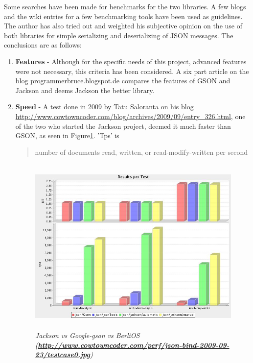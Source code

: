 Some searches have been made for benchmarks for the two libraries. A few
blogs\cite{jacksonvsgson} \cite{jacksonvsgson2} \cite{jacksonvsgson4} and the
wiki entries for a few benchmarking tools\cite{jacksonvsgson3} \cite{jacksonvsgson5}
have been used as guidelines. The author has also tried out and weighted his
subjective opinion on the use of both libraries for simple serializing and
deserializing of JSON messages. The conclusions are as follows:
\begin{enumerate}
  \item \textbf{Features} - Although for the specific needs of this project,
  advanced features were not necessary, this criteria has been considered. A
  six part article on the blog programmerbruce.blogspot.de compares the features
  of GSON and Jackson and deems Jackson the better library.
  
  \item \textbf{Speed} - A test done in 2009 by Tatu Saloranta on his blog
  \url{http://www.cowtowncoder.com/blog/archives/2009/09/entry_326.html}, one of
  the two who started the Jackson project, deemed it much faster than GSON, as
  seen in Figure\ref{fig:jacksonvsgson1}. 'Tps' is \begin{quote}number of
  documents read, written, or read-modify-written per second\end{quote}
   
  \begin{figure}
  \includegraphics[height=3.5in,width=6.23in]{./images/benchmarks/testcase0.jpg}
  \caption{\small \sl Jackson vs Google-gson vs BerliOS
  (\textbf{\url{http://www.cowtowncoder.com/perf/json-bind-2009-09-23/testcase0.jpg}})}
  \label{fig:jacksonvsgson1}
  \end{figure}
  

\end{enumerate}
